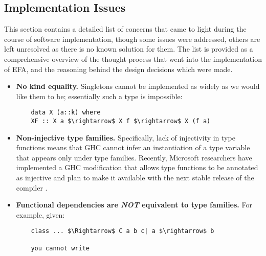 \documentclass[journal,12pt,onecolumn,draftclsnofoot]{article}
\let\Oldsubsection\subsection
\renewcommand{\subsection}{\FloatBarrier\Oldsubsection}
\begin{document}
\subsection{Implementation Issues}

This section contains a detailed list of concerns that came to light during the 
course of software implementation, though some issues were addressed, others 
are left unresolved as there is no known solution for them. The list is 
provided as a comprehensive overview of the thought process that went into the 
implementation of EFA, and the reasoning behind the design decisions which were 
made.

\begin{itemize}
    \item \textbf{No kind equality.} Singletons cannot be implemented as widely 
    as we would like them to be; essentially such a type is impossible:
    \begin{lstlisting}
    data X (a::k) where
    XF :: X a $\rightarrow$ X f $\rightarrow$ X (f a)
    \end{lstlisting}
    \item \textbf{Non-injective type families.} Specifically, lack of 
    injectivity in type functions means that GHC cannot infer an instantiation 
    of a type variable that appears only under type families. Recently, 
    Microsoft researchers have implemented a GHC modification that allows type 
    functions to be annotated as injective and plan to make it available with 
    the next stable release of the compiler \cite{microsoft}.
    \item \textbf{Functional dependencies are \textit{NOT} equivalent to type 
        families.} For example, given:
    \begin{lstlisting}
    class ... $\Rightarrow$ C a b c| a $\rightarrow$ b
    
    you cannot write
    

\end{lstlisting}
\end{itemize}
\end{document}
